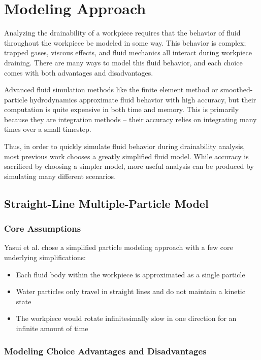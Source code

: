 						\chapter{Modeling Approach}

Analyzing the drainability of a workpiece requires that the behavior of fluid throughout the workpiece be modeled in some way. This behavior is complex; trapped gases, viscous effects, and fluid mechanics all interact during workpiece draining. There are many ways to model this fluid behavior, and each choice comes with both advantages and disadvantages.

Advanced fluid simulation methods like the finite element method or smoothed-particle hydrodynamics approximate fluid behavior with high accuracy, but their computation is quite expensive in both time and memory. This is primarily because they are integration methods -- their accuracy relies on integrating many times over a small timestep.

Thus, in order to quickly simulate fluid behavior during drainability analysis, most previous work chooses a greatly simplified fluid model. While accuracy is sacrificed by choosing a simpler model, more useful analysis can be produced by simulating many different scenarios.

\section{Straight-Line Multiple-Particle Model}

	\subsection{Core Assumptions}

Yasui et al. \cite{Yasui2011} chose a simplified particle modeling approach with a few core underlying simplifications:

\begin{itemize}
	\item Each fluid body within the workpiece is approximated as a single particle
	\item Water particles only travel in straight lines and do not maintain a kinetic state
	\item The workpiece would rotate infinitesimally slow in one direction for an infinite amount of time
\end{itemize}

	\subsection{Modeling Choice Advantages and Disadvantages}

